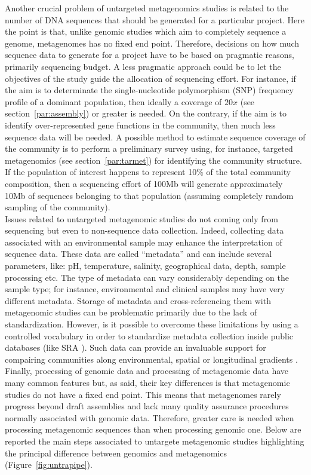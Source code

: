 Another crucial problem of untargeted metagenomics studies is related to the number of DNA sequences that should be generated for a particular project. Here the point is that, unlike genomic studies which aim to completely sequence a genome, metagenomes has no fixed end point. Therefore, decisions on how much sequence data to generate for a project have to be based on pragmatic reasons, primarily sequencing budget. A less pragmatic approach could be to let the objectives of the study guide the allocation of sequencing effort. For instance, if the aim is to determinate the single-nucleotide polymorphism (SNP) frequency profile of a dominant population, then ideally a coverage of $20x$ (see section~\ref{par:assembly}) or greater is needed. On the contrary, if the aim is to identify over-represented gene functions in the community, then much less sequence data will be needed. A possible method to estimate sequence coverage of the community is to perform a preliminary survey using, for instance, targeted metagenomics (see section~\ref{par:tarmet}) for identifying the community structure. If the population of interest happens to represent 10\% of the total community composition, then a sequencing effort of 100Mb will generate approximately 10Mb of sequences belonging to that population (assuming completely random sampling of the community).\\
Issues related to untargeted metagenomic studies do not coming only from sequencing but even to non-sequence data collection. Indeed, collecting data associated with an environmental sample may enhance the interpretation of sequence data. These data are called ``metadata'' and can include several parameters, like: pH, temperature, salinity, geographical data, depth, sample processing etc. The type of metadata can vary considerably depending on the sample type; for instance, environmental and clinical samples may have very different metadata. Storage of metadata and cross-referencing them with metagenomic studies can be problematic primarily due to the lack of standardization. However, is it possible to overcome these limitations by using a controlled vocabulary in order to standardize metadata collection inside public databases (like SRA \cite{kodama2012sequence}). Such data can provide an invaluable support for compairing communities along environmental, spatial or longitudinal gradients \cite{erkel2006genome}.\\
Finally, processing of genomic data and processing of metagenomic data have many common features but, as said, their key differences is that metagenomic studies do not have a fixed end point. This means that metagenomes rarely progress beyond draft assemblies and lack many quality assurance procedures normally associated with genomic data. Therefore, greater care is needed when processing metagenomic sequences than when processing genomic one. Below are reported the main steps associated to untargete metagenomic studies highlighting the principal difference between genomics and metagenomics (Figure~\ref{fig:untrapipe}).\\
